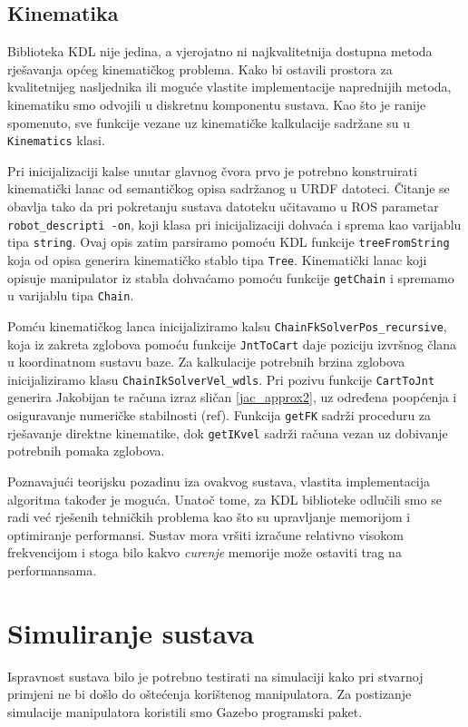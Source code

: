 \documentclass[times, utf8, diplomski, numeric]{fer}
\begin{document}
\subsection{Kinematika}
Biblioteka KDL nije jedina, a vjerojatno ni najkvalitetnija dostupna metoda rješavanja općeg kinematičkog problema.
Kako bi ostavili prostora za kvalitetnijeg nasljednika ili moguće vlastite implementacije naprednijih metoda, kinematiku smo odvojili u diskretnu komponentu sustava.
Kao što je ranije spomenuto, sve funkcije vezane uz kinematičke kalkulacije sadržane su u  \texttt{Kinematics} klasi.

Pri inicijalizaciji kalse unutar glavnog čvora prvo je potrebno konstruirati kinematički lanac od semantičkog opisa sadržanog u URDF datoteci.
Čitanje se obavlja tako da pri pokretanju sustava datoteku učitavamo u ROS parametar \texttt{robot\_descripti -on}, koji klasa pri inicijalizaciji dohvaća i sprema kao varijablu tipa \texttt{string}.
Ovaj opis zatim parsiramo pomoću KDL funkcije  \texttt{treeFromString} koja od opisa generira kinematičko stablo tipa \texttt{Tree}.
Kinematički lanac koji opisuje manipulator iz stabla dohvaćamo pomoću funkcije \texttt{getChain} i spremamo u varijablu tipa \texttt{Chain}.

Pomću kinematičkog lanca inicijaliziramo kalsu \texttt{ChainFkSolverPos\_recur\-sive}, koja iz zakreta zglobova pomoću funkcije \texttt{JntToCart} daje poziciju izvršnog člana u koordinatnom sustavu baze.
Za kalkulacije potrebnih brzina zglobova inicijaliziramo klasu \texttt{ChainIkSolverVel\_wdls}.
Pri pozivu funkcije \texttt{CartToJnt} generira Jakobijan te računa izraz sličan \ref{jac_approx2}, uz određena poopćenja i osiguravanje numeričke stabilnosti (ref).
Funkcija \texttt{getFK} sadrži proceduru za rješavanje direktne kinematike, dok \texttt{getIKvel} sadrži računa vezan uz dobivanje potrebnih pomaka zglobova.

Poznavajući teorijsku pozadinu iza ovakvog sustava, vlastita implementacija algoritma također je moguća.
Unatoč tome, za KDL biblioteke odlučili smo se radi već rješenih tehničkih problema kao što su upravljanje memorijom i optimiranje performansi.
Sustav mora vršiti izračune relativno visokom frekvencijom i stoga bilo kakvo \textit{curenje} memorije može ostaviti trag na performansama.

\section{Simuliranje sustava}\label{simuliranje}
Ispravnost sustava bilo je potrebno testirati na simulaciji kako pri stvarnoj primjeni ne bi došlo do oštećenja korištenog manipulatora.
Za postizanje simulacije manipulatora koristili smo Gazebo programski paket.
\end{document}
